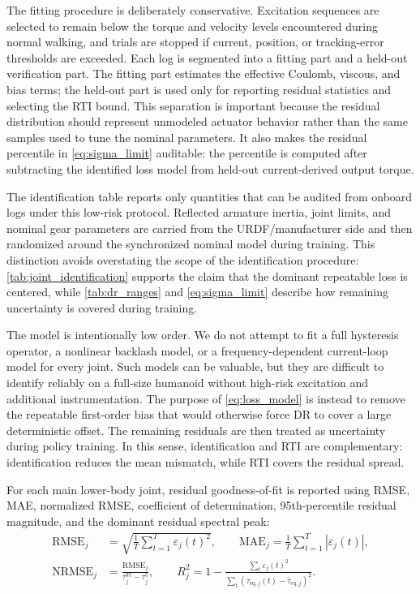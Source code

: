 \documentclass[twoside,final,1p,times]{elsarticle}
\newenvironment{revblock}{}{}
\begin{document}
\begin{revblock}
The fitting procedure is deliberately conservative. Excitation sequences are selected to remain below the torque and velocity levels encountered during normal walking, and trials are stopped if current, position, or tracking-error thresholds are exceeded. Each log is segmented into a fitting part and a held-out verification part. The fitting part estimates the effective Coulomb, viscous, and bias terms; the held-out part is used only for reporting residual statistics and selecting the RTI bound. This separation is important because the residual distribution should represent unmodeled actuator behavior rather than the same samples used to tune the nominal parameters. It also makes the residual percentile in \cref{eq:sigma_limit} auditable: the percentile is computed after subtracting the identified loss model from held-out current-derived output torque.

The identification table reports only quantities that can be audited from onboard logs under this low-risk protocol. Reflected armature inertia, joint limits, and nominal gear parameters are carried from the URDF/manufacturer side and then randomized around the synchronized nominal model during training. This distinction avoids overstating the scope of the identification procedure: \cref{tab:joint_identification} supports the claim that the dominant repeatable loss is centered, while \cref{tab:dr_ranges} and \cref{eq:sigma_limit} describe how remaining uncertainty is covered during training.

The model is intentionally low order. We do not attempt to fit a full hysteresis operator, a nonlinear backlash model, or a frequency-dependent current-loop model for every joint. Such models can be valuable, but they are difficult to identify reliably on a full-size humanoid without high-risk excitation and additional instrumentation. The purpose of \cref{eq:loss_model} is instead to remove the repeatable first-order bias that would otherwise force DR to cover a large deterministic offset. The remaining residuals are then treated as uncertainty during policy training. In this sense, identification and RTI are complementary: identification reduces the mean mismatch, while RTI covers the residual spread.
\end{revblock}

\begin{revblock}
For each main lower-body joint, residual goodness-of-fit is reported using RMSE, MAE, normalized RMSE, coefficient of determination, 95th-percentile residual magnitude, and the dominant residual spectral peak:
\begin{align}
\mathrm{RMSE}_j &= \sqrt{\frac{1}{T}\sum_{t=1}^{T}\varepsilon_j(t)^2},\qquad
\mathrm{MAE}_j=\frac{1}{T}\sum_{t=1}^{T}|\varepsilon_j(t)|,\label{eq:rmse_mae}\\
\mathrm{NRMSE}_j&=\frac{\mathrm{RMSE}_j}{\tau^{95}_j-\tau^{5}_j},\qquad
R_j^2=1-\frac{\sum_t\varepsilon_j(t)^2}{\sum_t(\tau_{\mathrm{eq},j}(t)-\bar\tau_{\mathrm{eq},j})^2}.\label{eq:nrmse_r2}
\end{align}
\end{revblock}
\end{document}
